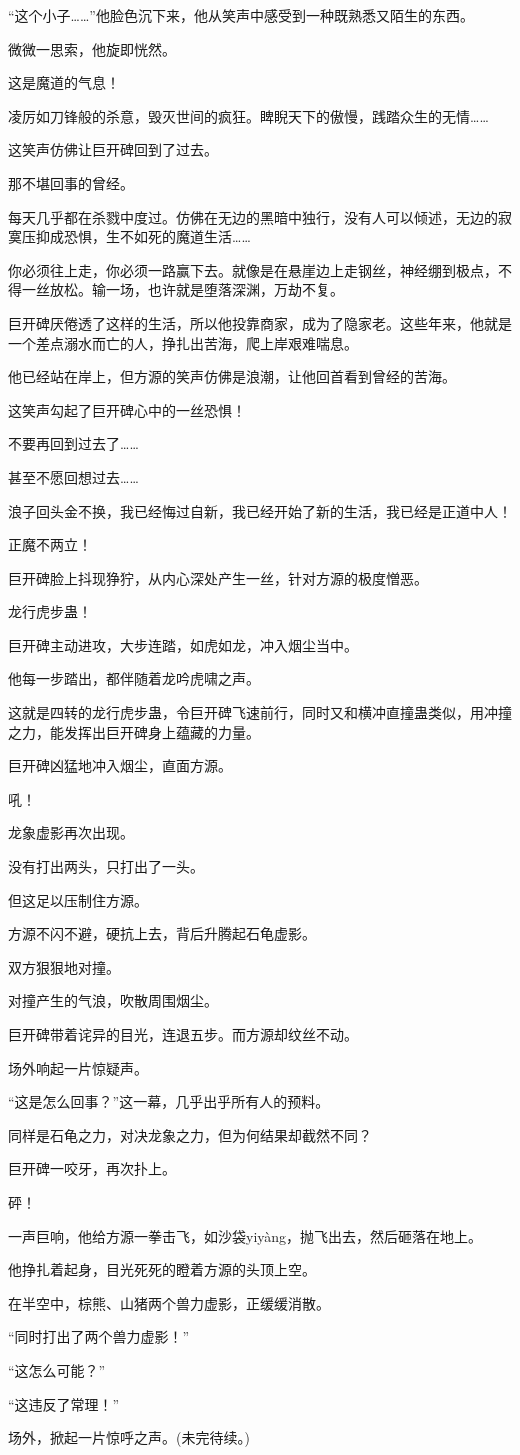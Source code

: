 \begin{this_body}
“这个小子……”他脸色沉下来，他从笑声中感受到一种既熟悉又陌生的东西。

微微一思索，他旋即恍然。

这是魔道的气息！

凌厉如刀锋般的杀意，毁灭世间的疯狂。睥睨天下的傲慢，践踏众生的无情……

这笑声仿佛让巨开碑回到了过去。

那不堪回事的曾经。

每天几乎都在杀戮中度过。仿佛在无边的黑暗中独行，没有人可以倾述，无边的寂寞压抑成恐惧，生不如死的魔道生活……

你必须往上走，你必须一路赢下去。就像是在悬崖边上走钢丝，神经绷到极点，不得一丝放松。输一场，也许就是堕落深渊，万劫不复。

巨开碑厌倦透了这样的生活，所以他投靠商家，成为了隐家老。这些年来，他就是一个差点溺水而亡的人，挣扎出苦海，爬上岸艰难喘息。

他已经站在岸上，但方源的笑声仿佛是浪潮，让他回首看到曾经的苦海。

这笑声勾起了巨开碑心中的一丝恐惧！

不要再回到过去了……

甚至不愿回想过去……

浪子回头金不换，我已经悔过自新，我已经开始了新的生活，我已经是正道中人！

正魔不两立！

巨开碑脸上抖现狰狞，从内心深处产生一丝，针对方源的极度憎恶。

龙行虎步蛊！

巨开碑主动进攻，大步连踏，如虎如龙，冲入烟尘当中。

他每一步踏出，都伴随着龙吟虎啸之声。

这就是四转的龙行虎步蛊，令巨开碑飞速前行，同时又和横冲直撞蛊类似，用冲撞之力，能发挥出巨开碑身上蕴藏的力量。

巨开碑凶猛地冲入烟尘，直面方源。

吼！

龙象虚影再次出现。

没有打出两头，只打出了一头。

但这足以压制住方源。

方源不闪不避，硬抗上去，背后升腾起石龟虚影。

双方狠狠地对撞。

对撞产生的气浪，吹散周围烟尘。

巨开碑带着诧异的目光，连退五步。而方源却纹丝不动。

场外响起一片惊疑声。

“这是怎么回事？”这一幕，几乎出乎所有人的预料。

同样是石龟之力，对决龙象之力，但为何结果却截然不同？

巨开碑一咬牙，再次扑上。

砰！

一声巨响，他给方源一拳击飞，如沙袋yiyàng，抛飞出去，然后砸落在地上。

他挣扎着起身，目光死死的瞪着方源的头顶上空。

在半空中，棕熊、山猪两个兽力虚影，正缓缓消散。

“同时打出了两个兽力虚影！”

“这怎么可能？”

“这违反了常理！”

场外，掀起一片惊呼之声。(未完待续。)

\end{this_body}

